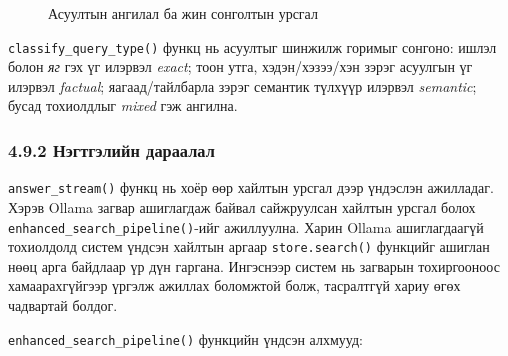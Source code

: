 \documentclass[11pt,a4paper]{article}
\begin{document}
\begin{figure}[H]
\caption{Асуултын ангилал ба жин сонголтын урсгал}
\label{fig:query-classification-flow}
\end{figure}

\texttt{classify\_query\_type()} функц нь асуултыг шинжилж горимыг сонгоно: ишлэл болон \textit{яг} гэх үг илэрвэл \textit{exact}; тоон утга, хэдэн/хэзээ/хэн зэрэг асуулгын үг илэрвэл \textit{factual}; яагаад/тайлбарла зэрэг семантик түлхүүр илэрвэл \textit{semantic}; бусад тохиолдлыг \textit{mixed} гэж ангилна.

\subsubsection*{4.9.2 Нэгтгэлийн дараалал}

\texttt{answer\_stream()} функц нь хоёр өөр хайлтын урсгал дээр үндэслэн ажилладаг. Хэрэв Ollama загвар ашиглагдаж байвал сайжруулсан хайлтын урсгал болох \texttt{enhanced\_search\_pipeline()}-ийг ажиллуулна. Харин Ollama ашиглагдаагүй тохиолдолд систем үндсэн хайлтын аргаар \texttt{store.search()} функцийг ашиглан нөөц арга байдлаар үр дүн гаргана. Ингэснээр систем нь загварын тохиргооноос хамаарахгүйгээр үргэлж ажиллах боломжтой болж, тасралтгүй хариу өгөх чадвартай болдог.

\texttt{enhanced\_search\_pipeline()} функцийн үндсэн алхмууд:
\end{document}

